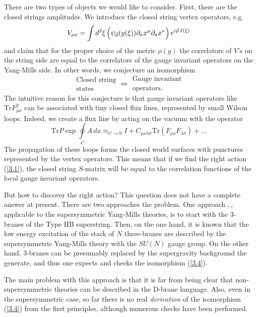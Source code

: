 \documentclass[a4paper,12pt]{article}
\numberwithin{equation}{section}
\begin{document}
There are two types of objects we would like to consider. First, there are the
closed strings amplitudes. We introduce the closed string vertex operators,
e.g.
\[
V_{\mu \nu }=\int d^{2}\xi \left( \vphantom {\sum }\psi _{\vec{p}}(y(\xi ))\partial _{a}x^{\mu }\partial _{a}x^{\nu }\right) e^{i\vec{p}\, \vec{x}(\xi )}\]
 and claim that for the proper choice of the metric \( \rho (y) \) the correlators
of \( V \)'s on the string side are equal to the correlators of the gauge invariant
operators on the Yang-Mills side. In other words, we conjecture an isomorphism
\begin{equation}
\label{3.4}
\begin{array}{c}
\textrm{Closed string}\\
\textrm{states}
\end{array}\Longleftrightarrow \begin{array}{c}
\textrm{Gauge invariant}\\
\textrm{operators}.
\end{array}
\end{equation}
 The intuitive reason for this conjecture is that gauge invariant operators
like \( \textrm{Tr}F_{\mu \nu }^{2} \) can be associated with tiny closed flux
lines, represented by small Wilson loops. Indeed, we create a flux line by acting
on the vacuum with the operator 
\[
\textrm{Tr}P\exp \oint\limits _{C}A\, dx\mathop {\approx }_{C\to 0}I+C_{\mu \nu \lambda \sigma }\textrm{Tr}(F_{\mu \nu }F_{\lambda \sigma })+\ldots \]
 The propagation of these loops forms the closed world surfaces with punctures
represented by the vertex operators. This means that if we find the right action
(\ref{3.1}), the closed string \( S \)-matrix will be equal to the correlation
functions of the local gauge invariant operators.

But how to discover the right action? This question does not have a complete
answer at present. There are two approaches the problem. One approach \cite{2},\,\cite{3},
applicable to the supersymmetric Yang-Mills theories, is to start with the 3-branes
of the Type IIB superstring. Then, on the one hand, it is known that the low
energy excitation of the stack of \( N \) three-branes are described by the
supersymmetric Yang-Mills theory with the \( SU(N) \) gauge group. On the other
hand, 3-branes can be presumably replaced by the supergravity background the
generate, and thus one expects and checks the isomorphism (\ref{3.4}). 

The main problem with this approach is that it is far from being clear that
non-supersymmetric theories can be described in the D-brane language. Also,
even in the supersymmetric case, so far there is no real \emph{derivation} of
the isomorphism (\ref{3.4}) from the first principles, although numerous checks
have been performed.
\end{document}
